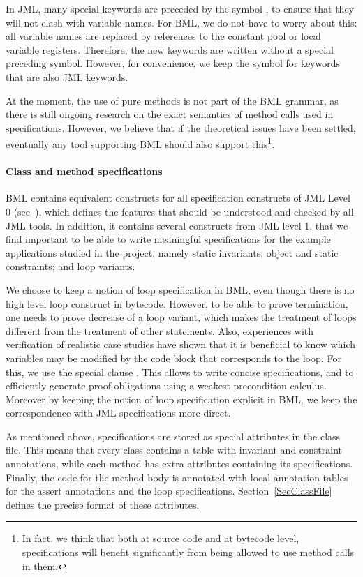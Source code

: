 In JML, many special keywords are preceded by the symbol
\codeHook{\bsl}, to ensure that they will not clash with variable
names. For BML, we do not have to worry about this: all
variable names are replaced by references to the constant pool or
local variable registers. Therefore, the new keywords are written
without a special preceding symbol. However, for convenience, we keep
the symbol for keywords that are also JML keywords.

At the moment, the use of pure methods is not part of the BML grammar,
as there is still ongoing research on the exact semantics of method
calls used in specifications. However, we believe that if the
theoretical issues have been settled, eventually any tool supporting
BML should also support this\footnote{In fact, we think that both at
source code and at bytecode level, specifications will benefit
significantly from being allowed to use method calls in them.}.

\paragraph{Class and method specifications}
BML contains equivalent constructs for all specification constructs of
JML Level 0 (see~\cite[\S2.9]{JMLReferenceManual05}), which defines
the features that should be understood and checked by all JML
tools. In addition, it contains several constructs from JML level 1,
that we find important to be able to write meaningful specifications
for the example applications studied in the \mobius project, namely
static invariants; object and static constraints; and loop variants.

We choose to keep a notion of loop specification in BML, even though
there is no high level loop construct in bytecode. However, to be able
to prove termination, one needs to prove decrease of a loop variant,
which makes the treatment of loops different from the treatment of
other statements. Also, experiences with verification of realistic
case studies have shown that it is beneficial to know which variables
may be modified by the code block that corresponds to the loop. For
this, we use the special clause . This
allows to write concise specifications, and to efficiently generate
proof obligations using a weakest precondition calculus.  Moreover by
keeping the notion of loop specification explicit in BML, we keep the
correspondence with JML specifications more direct.


As mentioned above, specifications are stored as special attributes in
the class file. This means that every class contains a table with
invariant and constraint annotations, while each method has extra
attributes containing its specifications. Finally, the code for the
method body is annotated with local annotation tables for the assert
annotations and the loop specifications. Section~\ref{SecClassFile}
defines the precise format of these attributes.


